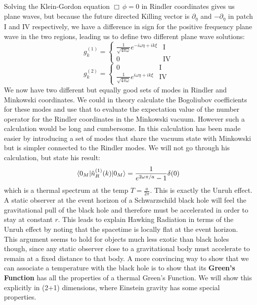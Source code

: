 %
%
Solving the Klein-Gordon equation $\Box \, \phi = 0$ in Rindler coordinates gives us plane waves, but because the future directed Killing vector is $\partial_{\eta}$ and $-\partial_{\eta}$ in patch I and IV respectively, we have a difference in sign for the positive frequency plane wave in the two regions, leading us to define two different plane wave solutions:
\begin{equation}
g_k^{(1)} = 
\begin{cases}
\frac{1}{\sqrt{4 \pi \omega}} e^{-i \omega \eta + i k \xi} & \text{I} \\
0 & \text{IV}
\end{cases}
\end{equation}
\begin{equation}
g_k^{(2)} = 
\begin{cases}
0 & \text{I} \\
\frac{1}{\sqrt{4 \pi \omega}} e^{i \omega \eta + i k \xi} & \text{IV}
\end{cases} \; \;
\end{equation}
We now have two different but equally good sets of modes in Rindler and Minkowski coordinates. We could in theory calculate the Bogoliubov coefficients for these modes and use that to evaluate the expectation value of the number operator for the Rindler coordinates in the Minkowski vacuum. However such a calculation would be long and cumbersome. In \cite{GR} this calculation has been made easier by introducing a set of modes that share the vacuum state with Minkowski but is simpler connected to the Rindler modes. We will not go through his calculation, but state his result:
\begin{equation}
\braket{0_M | \hat{n}_R^{(1)}(k) | 0_M} = \frac{1}{e^{2 \omega \pi / a} - 1} \delta(0)
\end{equation}
which is a thermal spectrum at the temp $T = \frac{a}{2 \pi}$. This is exactly the Unruh effect. A static observer at the event horizon of a Schwarzschild black hole will feel the gravitational pull of the black hole and therefore must be accelerated in order to stay at constant $r$. This leads \cite{GR} to explain Hawking Radiation in terms of the Unruh effect by noting that the spacetime is locally flat at the event horizon. This argument seems to hold for objects much less exotic than black holes though, since any static observer close to a gravitational body must accelerate to remain at a fixed distance to that body. A more convincing way to show that we can associate a temperature with the black hole is to show that its \textbf{Green's Function} has all the properties of a thermal Green's Function. We will show this explicitly in (2+1) dimensions, where Einstein gravity has some special properties.

